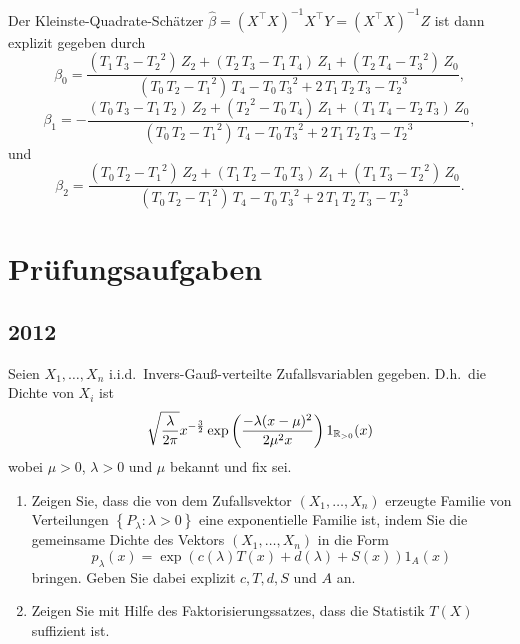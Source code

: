 Der Kleinste-Quadrate-Schätzer 
$\hat \beta = \left( X^\top X \right)^{-1} X^\top Y = \left( X^\top X \right)^{-1} Z$ ist dann explizit
gegeben durch
\begin{equation*}
    \beta_0 = 
\frac{\left({ T_1}\,{ T_3}-{ T_2}^2\right)\,{ Z_2}+
 \left({ T_2}\,{ T_3}-{ T_1}\,{ T_4}\right)\,{ Z_1}+
 \left({ T_2}\,{ T_4}-{ T_3}^2\right)\,{ Z_0}}{
 \left({ T_0}\,{ T_2}-{ T_1}^2\right)\,{ T_4}-{ T_0}\,
 { T_3}^2+2\,{ T_1}\,{ T_2}\,{ T_3}-{ T_2}^3},
\end{equation*}
\begin{equation*}
    \beta_1 = 
-  \frac{\left({ T_0}\,{ T_3}-{ T_1}\,{ T_2}\right)\,
 { Z_2}+\left({ T_2}^2-{ T_0}\,{ T_4}\right)\,{ Z_1}+
 \left({ T_1}\,{ T_4}-{ T_2}\,{ T_3}\right)\,{ Z_0}
 }{\left({ T_0}\,{ T_2}-{ T_1}^2\right)\,{ T_4}-
 { T_0}\,{ T_3}^2+2\,{ T_1}\,{ T_2}\,{ T_3}-{ T_2}^
 3},
\end{equation*}
und
\begin{equation*}
    \beta_2 = 
 \frac{\left({ T_0}\,{ T_2}-{ T_1}^2\right)\,{ Z_2}+
 \left({ T_1}\,{ T_2}-{ T_0}\,{ T_3}\right)\,{ Z_1}+
 \left({ T_1}\,{ T_3}-{ T_2}^2\right)\,{ Z_0}}{
 \left({ T_0}\,{ T_2}-{ T_1}^2\right)\,{ T_4}-{ T_0}\,
 { T_3}^2+2\,{ T_1}\,{ T_2}\,{ T_3}-{ T_2}^3}.
\end{equation*}



\section{Prüfungsaufgaben}
\subsection{2012}

Seien $X_1,\ldots,X_n$ i.i.d.\ Invers-Gauß-verteilte Zufallsvariablen gegeben. D.h.\ die Dichte
von $X_i$ ist 
\begin{equation*}
    \sqrt{\frac{\lambda}{2\pi}} x^{-\frac{3}{2}} \exp\left( \frac{-\lambda(x-\mu)^2}{2\mu^2 x} \right) 1_{\mathbb R_{>0}} (x)
\end{equation*}
wobei $\mu>0$, $\lambda>0$ und $\mu$ bekannt und fix sei.
\begin{enumerate}
    \item Zeigen Sie, dass die von dem Zufallsvektor $( X_1,\ldots,X_n)$
        erzeugte Familie von Verteilungen $\left\{ P_\lambda : \lambda>0
        \right\}$ eine exponentielle Familie ist, indem Sie die gemeinsame
        Dichte des Vektors $(X_1,\ldots,X_n)$ in die Form
        \begin{equation*}
            p_\lambda(x) = \exp\left( c(\lambda) T(x) + d(\lambda) + S(x) \right)1_A (x)
        \end{equation*}
        bringen. Geben Sie dabei explizit $c,T,d,S$ und $A$ an.
    \item Zeigen Sie mit Hilfe des Faktorisierungssatzes, dass die Statistik
        $T(X)$ suffizient ist.
\end{enumerate}

